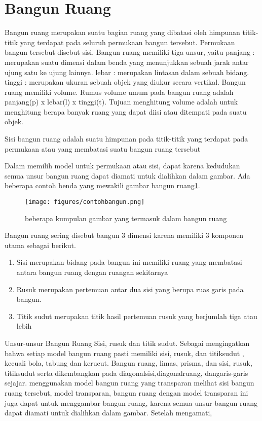 	
\section{Bangun Ruang}
Bangun ruang merupakan suatu bagian ruang yang dibatasi oleh himpunan titik-titik yang terdapat pada seluruh permukaan bangun tersebut. 
Permukaan bangun tersebut disebut sisi. Bangun ruang memiliki tiga unsur, yaitu 
panjang : merupakan suatu dimensi dalam benda yang menunjukkan sebuah jarak antar ujung satu ke ujung lainnya.
lebar   : merupakan lintasan dalam sebuah bidang.
tinggi  : merupakan ukuran sebuah objek yang diukur secara vertikal.
Bangun ruang memiliki volume. Rumus volume umum pada bangun ruang adalah panjang(p) x lebar(l) x tinggi(t).
Tujuan menghitung volume adalah untuk menghitung berapa banyak ruang yang dapat diisi atau ditempati pada suatu objek.

Sisi bangun ruang adalah suatu himpunan pada titik-titik yang terdapat pada permukaan atau yang membatasi suatu bangun ruang tersebut \cite{umami2013eksperimentasi}

Dalam memilih model untuk permukaan atau sisi, dapat karena kedudukan semua unsur bangun ruang dapat diamati untuk dialihkan dalam gambar\cite{suharjana2008mengenal}. 
Ada beberapa contoh benda yang mewakili gambar bangun ruang\ref{contohbangun}.
\begin{figure}[ht]
    \centerline{\texttt{[image: figures/contohbangun.png]}}
    \caption{beberapa kumpulan gambar yang termasuk dalam bangun ruang}
    \label{contohbangun}
    \end{figure}
 
Bangun ruang sering  disebut bangun 3 dimensi karena memiliki 3 komponen utama sebagai berikut.
\begin{enumerate}
\item Sisi  merupakan bidang pada bangun ini memiliki ruang yang membatasi antara bangun ruang dengan ruangan sekitarnya 
\item Rusuk merupakan pertemuan antar dua sisi yang berupa ruas garis pada bangun.
\item Titik sudut merupakan titik hasil pertemuan rusuk yang berjumlah tiga atau lebih
\end{enumerate}

Unsur-unsur Bangun Ruang Sisi, rusuk dan titik sudut. Sebagai mengingatkan bahwa setiap model bangun ruang pasti memiliki sisi, rusuk, dan titiksudut , kecuali bola, tabung dan kerucut.
Bangun ruang, limas, prisma, dan sisi, rusuk, titiksudut serta dikembangkan pada diagonalsisi,diagonalruang, dangaris-garis sejajar.
menggunakan model bangun ruang yang transparan  melihat sisi bangun ruang tersebut, model transparan, bangun ruang dengan model transparan ini juga dapat untuk menggambar bangun ruang, karena semua unsur bangun ruang dapat diamati untuk dialihkan dalam gambar. Setelah mengamati, 

